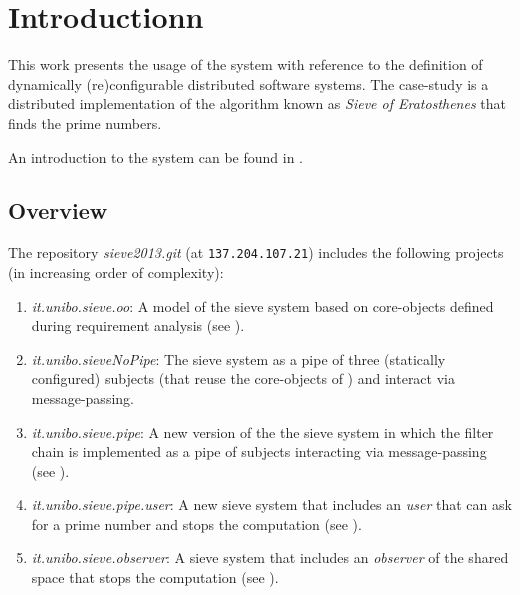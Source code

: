 \documentclass{../llncs}
\begin{document}
\newpage
\section{Introductionn}
This work presents the usage of the \contact{} system with reference to the definition of  dynamically (re)configurable distributed software systems. The case-study is a distributed implementation of the algorithm known as \emph{Sieve of Eratosthenes} that finds the prime numbers.

An introduction to the  \contact{} system can be found in \cite{Nat2013a}. 


\subsection{Overview}

The repository \textit{sieve2013.git} (at \texttt{137.204.107.21}) includes the following projects (in increasing order of complexity):

\begin{enumerate}
\item \textit{it.unibo.sieve.oo}:  A model of the sieve system based on core-objects defined during requirement analysis (see ).
\item \textit{it.unibo.sieveNoPipe}: The sieve system as a pipe of three (statically configured) subjects (that reuse the core-objects of ) and interact via message-passing.
\item \textit{it.unibo.sieve.pipe}: A new version of the the sieve system in which the filter chain is implemented as a pipe of subjects interacting via message-passing (see ).
\item \textit{it.unibo.sieve.pipe.user}: A new sieve system that includes an \textit{user} that can ask for a prime number and stops the computation (see ).
\item \textit{it.unibo.sieve.observer}: A sieve system that includes an \textit{observer} of the shared space that stops the computation (see ).

\end{enumerate}
\end{document}
